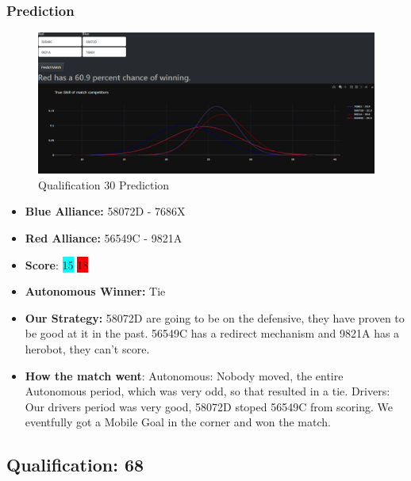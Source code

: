 \subsubsection*{Prediction}
\begin{figure}[H]
    \centering
    \includegraphics[width=0.8\linewidth]{images/Q30ND.png}
    \caption{Qualification 30 Prediction}
    \label{fig:Qual-30-ND}
\end{figure}
\begin{itemize}
    \item \textbf{Blue Alliance:} 58072D - 7686X
    \item \textbf{Red Alliance:} 56549C - 9821A
    \item \textbf{Score}: \colorbox{cyan}{15}
    \colorbox{red}{18}
    \item \textbf{Autonomous Winner:} Tie
    \item \textbf{Our Strategy:} 58072D are going to be on the defensive, they have proven to be good at it in the past. 56549C has a redirect mechanism and 9821A has a herobot, they can't score.
    \item \textbf{How the match went}: Autonomous: Nobody moved, the entire Autonomous period, which was very odd, so that resulted in a tie. Drivers: Our drivers period was very good, 58072D stoped 56549C from scoring. We eventfully got a Mobile Goal in the corner and won the match.
\end{itemize}

\subsection*{Qualification: 68}
